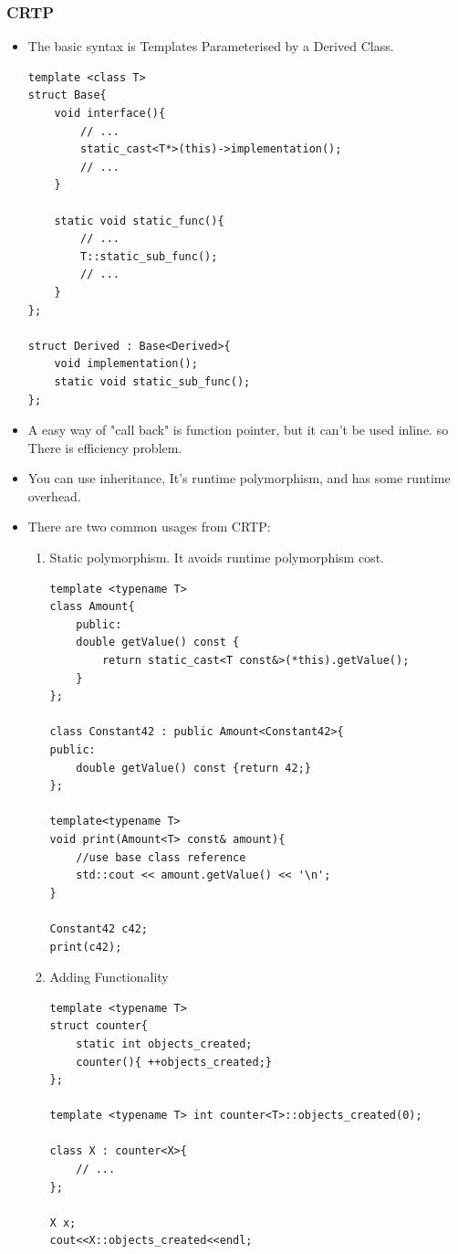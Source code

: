 \documentclass[a4paper,11pt,twoside]{book}
\begin{document}
\subsubsection{CRTP}
\begin{itemize}
	\item The basic syntax is Templates Parameterised by a Derived Class.
	
\begin{lstlisting}[numbers=none]
template <class T> 
struct Base{
	void interface(){
		// ...
		static_cast<T*>(this)->implementation();
		// ...
	}
	
	static void static_func(){
		// ...
		T::static_sub_func();
		// ...
	}
};
	
struct Derived : Base<Derived>{
	void implementation();
	static void static_sub_func();
};
\end{lstlisting}
	
	\item A easy way of "call back" is function pointer, but it can't be used inline. so There is efficiency problem. 
	
	\item You can use inheritance, It's runtime polymorphism, and has some runtime overhead. 
	
	\item There are two common usages from CRTP:
	\begin{enumerate}
		\item Static polymorphism. It avoids runtime polymorphism cost. 
\begin{lstlisting}[numbers=none]
template <typename T>
class Amount{
	public:
	double getValue() const {
		return static_cast<T const&>(*this).getValue();
	}
};

class Constant42 : public Amount<Constant42>{
public:
	double getValue() const {return 42;}
};

template<typename T>
void print(Amount<T> const& amount){
	//use base class reference
	std::cout << amount.getValue() << '\n';
}

Constant42 c42;
print(c42);
\end{lstlisting}
\item Adding Functionality
\begin{lstlisting}[numbers=none]
template <typename T>
struct counter{
	static int objects_created;
	counter(){ ++objects_created;}
};

template <typename T> int counter<T>::objects_created(0);

class X : counter<X>{
	// ...
};

X x;
cout<<X::objects_created<<endl;
\end{lstlisting}
	\end{enumerate}
\end{itemize}
\end{document}
